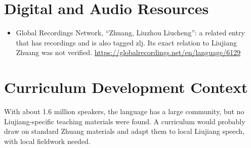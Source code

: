 \documentclass[12pt]{article}
\begin{document}
\section{Digital and Audio Resources}
\begin{itemize}
\item Global Recordings Network, ``Zhuang, Liuzhou Liucheng'': a related entry that has recordings and is also tagged zlj. Its exact relation to Liujiang Zhuang was not verified. \url{https://globalrecordings.net/en/language/6129}
\end{itemize}

\section{Curriculum Development Context}
With about 1.6 million speakers, the language has a large community, but no Liujiang-specific teaching materials were found. A curriculum would probably draw on standard Zhuang materials and adapt them to local Liujiang speech, with local fieldwork needed.
\end{document}
